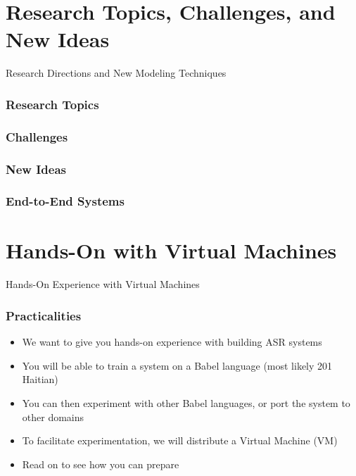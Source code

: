 \section{Research Topics, Challenges, and New Ideas}

\begin{frame}
  \begin{center}
    {\color{Maroon}\Huge Research Directions and}
     \vspace{0.2cm}
    {\color{Maroon}\Huge New Modeling Techniques}
  \end{center}
\end{frame}

\begin{frame}
  \frametitle{Research Topics}
\end{frame}

\begin{frame}
  \frametitle{Challenges}
\end{frame}

\begin{frame}
  \frametitle{New Ideas}
\end{frame}

\begin{frame}
  \frametitle{End-to-End Systems}
\end{frame}

\section{Hands-On with Virtual Machines}

\begin{frame}
  \begin{center}
    {\color{Maroon}\Huge Hands-On Experience with Virtual Machines}
  \end{center}
\end{frame}

\begin{frame}
  \frametitle{Practicalities}
  \begin{itemize}
  \item We want to give you hands-on experience with building ASR systems
  \item You will be able to train a system on a Babel language (most likely 201 Haitian)
  \item You can then experiment with other Babel languages, or port the system to other domains
  \item To facilitate experimentation, we will distribute a Virtual Machine (VM)
  \item {\color{Maroon}Read on to see how you can prepare}
  \end{itemize}
\end{frame}

